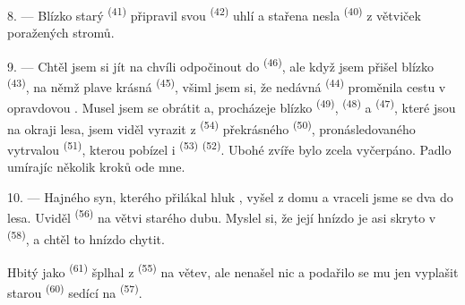 8. --- Blízko starý  \textsuperscript{(41)} připravil svou
 \textsuperscript{(42)} uhlí a stařena nesla 
\textsuperscript{(40)}  z větviček poražených stromů.

\VUsaut{3.0mm}
\VUsaut{3.0mm}

9. --- Chtěl jsem si jít na chvíli odpočinout do  \textsuperscript{(46)}, ale
když jsem přišel blízko  \textsuperscript{(43)}, na němž plave krásná
 \textsuperscript{(45)}, všiml jsem si, že nedávná 
\textsuperscript{(44)} proměnila cestu v opravdovou . Musel jsem se obrátit a,
procházeje blízko  \textsuperscript{(49)}, 
\textsuperscript{(48)} a  \textsuperscript{(47)}, které jsou na okraji lesa,
jsem viděl vyrazit z
 \textsuperscript{(54)} překrásného 
\textsuperscript{(50)}, pronásledovaného vytrvalou  \textsuperscript{(51)},
kterou pobízel i  \textsuperscript{(53)}
 \textsuperscript{(52)}. Ubohé zvíře bylo zcela vyčerpáno.
Padlo umírajíc několik kroků ode mne.

10. --- Hajného syn, kterého přilákal hluk , vyšel z domu a vraceli jsme se
dva do lesa. Uviděl  \textsuperscript{(56)} na větvi starého dubu. Myslel si,
že její hnízdo je asi skryto v  \textsuperscript{(58)}, a chtěl to hnízdo
chytit.

Hbitý jako  \textsuperscript{(61)} šplhal z 
\textsuperscript{(55)} na větev, ale nenašel nic a podařilo se mu jen vyplašit starou
 \textsuperscript{(60)} sedící na 
\textsuperscript{(57)}.
